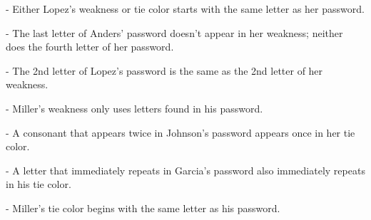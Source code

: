 \documentclass{article}
\begin{document}
{- Either Lopez’s weakness or tie color starts with the same letter as her password.

- The last letter of Anders’ password doesn’t appear in her weakness; neither does the fourth letter of her password.

- The 2nd letter of Lopez’s password is the same as the 2nd letter of her weakness.

- Miller’s weakness only uses letters found in his password.

- A consonant that appears twice in Johnson’s password appears once in her tie color.

- A letter that immediately repeats in Garcia’s password also immediately repeats in his tie color.

- Miller’s tie color begins with the same letter as his password.
}
\end{document}

